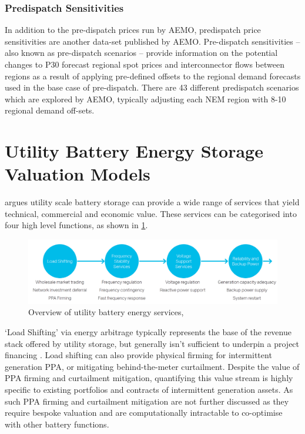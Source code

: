 \subsubsection{Predispatch Sensitivities}
In  addition  to  the  pre-dispatch  prices  run  by  AEMO,  predispatch  price  sensitivities are another data-set published by AEMO. Pre-dispatch sensitivities – also known as  pre-dispatch  scenarios  –  provide  information  on  the  potential  changes  to P30 forecast  regional  spot  prices  and  interconnector  flows  between  regions  as  a  result  of applying pre-defined offsets to the regional demand forecasts used in the base case of pre-dispatch. There are 43 different predispatch scenarios which are explored by AEMO, typically adjusting each NEM region with 8-10 regional demand off-sets. 
\section{ Utility Battery Energy Storage Valuation Models }
\textcite{AECOM} argues utility scale battery storage can provide a wide range of services that yield technical, commercial and economic value. These services can be categorised into four high level functions, as shown in \ref{fig:bess_services}. 
\begin{figure}
    \centering
    \includegraphics[width=\textwidth]{Pictures/Chapter2/bess_services.png}
    \caption{Overview of utility battery energy services, \parencite{AECOM}}
    \label{fig:bess_services}
\end{figure}
`Load Shifting' via energy arbitrage typically represents the base of the revenue stack offered by utility storage, but generally isn't sufficient to underpin a project financing \parencite{Mackenzie:2018}. Load shifting can also provide physical firming for intermittent generation PPA, or mitigating behind-the-meter curtailment.  Despite the value of PPA firming and curtailment mitigation, quantifying this value stream is highly specific to existing portfolios and contracts of intermittent generation assets. As such PPA firming and curtailment mitigation are not further discussed as they require bespoke valuation and are computationally intractable to co-optimise with other battery functions. 

